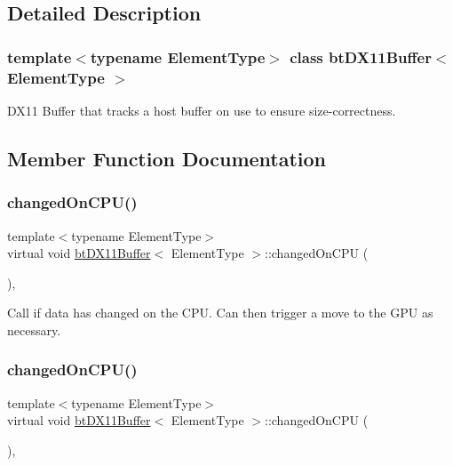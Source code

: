 \subsection{Detailed Description}
\subsubsection*{template$<$typename Element\+Type$>$\newline
class bt\+D\+X11\+Buffer$<$ Element\+Type $>$}

D\+X11 Buffer that tracks a host buffer on use to ensure size-\/correctness. 

\subsection{Member Function Documentation}
\mbox{\label{classbtDX11Buffer_a8018a897370ed73bcca0b4907b9479b1}} 
\subsubsection{\texorpdfstring{changed\+On\+C\+P\+U()}{changedOnCPU()}\hspace{0.1cm}{\footnotesize\ttfamily [1/2]}}
{\footnotesize\ttfamily template$<$typename Element\+Type$>$ \\
virtual void \hyperlink{classbtDX11Buffer}{bt\+D\+X11\+Buffer}$<$ Element\+Type $>$\+::changed\+On\+C\+PU (\begin{DoxyParamCaption}{ }\end{DoxyParamCaption})\hspace{0.3cm}{\ttfamily [inline]}, {\ttfamily [virtual]}}

Call if data has changed on the C\+PU. Can then trigger a move to the G\+PU as necessary. \mbox{\label{classbtDX11Buffer_a8018a897370ed73bcca0b4907b9479b1}} 
\subsubsection{\texorpdfstring{changed\+On\+C\+P\+U()}{changedOnCPU()}\hspace{0.1cm}{\footnotesize\ttfamily [2/2]}}
{\footnotesize\ttfamily template$<$typename Element\+Type$>$ \\
virtual void \hyperlink{classbtDX11Buffer}{bt\+D\+X11\+Buffer}$<$ Element\+Type $>$\+::changed\+On\+C\+PU (\begin{DoxyParamCaption}{ }\end{DoxyParamCaption})\hspace{0.3cm}{\ttfamily [inline]}, {\ttfamily [virtual]}}

